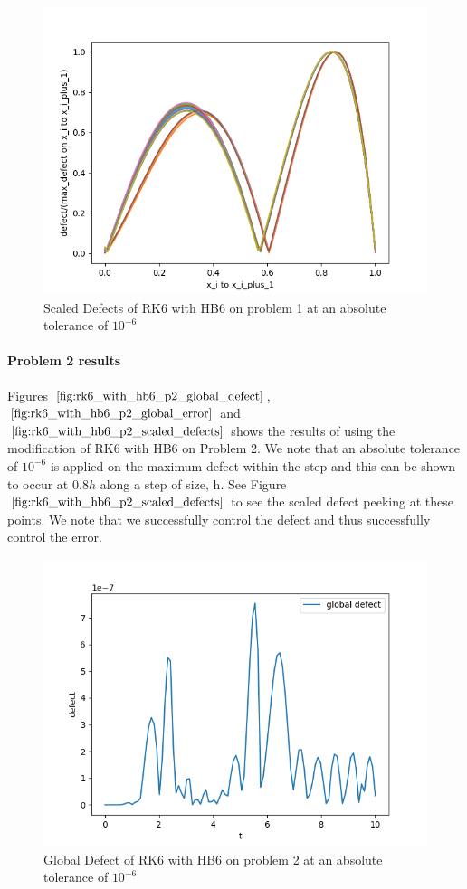 \documentclass{article}
\begin{document}
\begin{figure}[H]
\centering
\includegraphics[width=0.7\linewidth]{./figures/rk6_with_hb6_p1_scaled_defects}
\caption{Scaled Defects of RK6 with HB6 on problem 1 at an absolute tolerance of $10^{-6}$}
\label{fig:rk6_with_hb6_p1_scaled_defects}
\end{figure}

\paragraph{Problem 2 results}
Figures $\ref{fig:rk6_with_hb6_p2_global_defect}$, $\ref{fig:rk6_with_hb6_p2_global_error}$ and $\ref{fig:rk6_with_hb6_p2_scaled_defects}$ shows the results of using the modification of RK6 with HB6 on Problem 2. We note that an absolute tolerance of $10^{-6}$ is applied on the maximum defect within the step and this can be shown to occur at $0.8h$ along a step of size, h. See Figure $\ref{fig:rk6_with_hb6_p2_scaled_defects}$ to see the scaled defect peeking at these points. We note that we successfully control the defect and thus successfully control the error.

\begin{figure}[H]
\centering
\includegraphics[width=0.7\linewidth]{./figures/rk6_with_hb6_p2_global_defect}
\caption{Global Defect of RK6 with HB6 on problem 2 at an absolute tolerance of $10^{-6}$}
\label{fig:rk6_with_hb6_p2_global_defect}
\end{figure}
\end{document}
